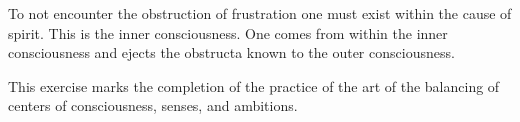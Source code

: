 

To not encounter the obstruction of frustration one must exist within
the cause of spirit.  This is the inner consciousness.  One comes from
within the inner consciousness and ejects the obstructa known to the
outer consciousness.

This exercise marks the completion of the practice of the art of the
balancing of centers of consciousness, senses, and ambitions.

\bye
